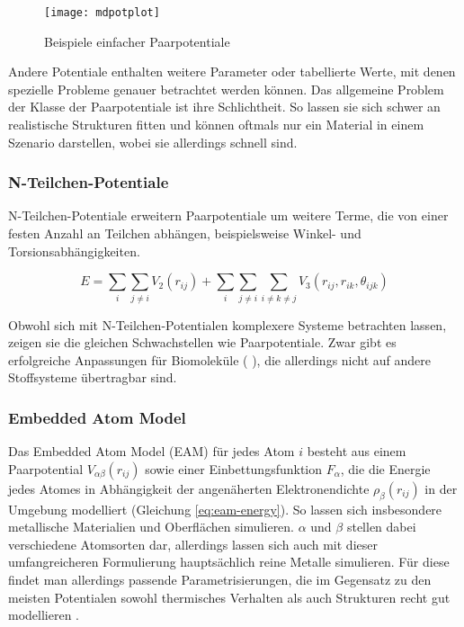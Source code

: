\begin{figure}
  \centering
  \texttt{[image: mdpotplot]}
  \caption{Beispiele einfacher Paarpotentiale}
  \label{fig:mdpairpotentials}
\end{figure}

Andere Potentiale enthalten weitere Parameter oder tabellierte Werte, mit denen spezielle Probleme genauer betrachtet werden können.
Das allgemeine Problem der Klasse der Paarpotentiale ist ihre Schlichtheit.
So lassen sie sich schwer an realistische Strukturen fitten und können oftmals nur ein Material in einem Szenario darstellen, wobei sie allerdings schnell sind.

\subsubsection{N-Teilchen-Potentiale}

N-Teilchen-Potentiale  erweitern Paarpotentiale um weitere Terme, die von einer festen Anzahl an Teilchen abhängen, beispielsweise Winkel- und Torsionsabhängigkeiten.

\begin{equation}
  \label{eq:nbody-energy}
  E = \sum_i\sum_{j \neq i}{V_2\left(r_{ij}\right)} + \sum_i\sum_{j \neq i}\sum_{i \neq k \neq j}{V_3\left(r_{ij}, r_{ik}, \theta_{ijk}\right)}
\end{equation}

Obwohl sich mit N-Teilchen-Potentialen komplexere Systeme betrachten lassen, zeigen sie die gleichen Schwachstellen wie Paarpotentiale.
Zwar gibt es erfolgreiche  Anpassungen für Biomoleküle (  ), die allerdings nicht auf andere Stoffsysteme übertragbar sind.

\subsubsection{Embedded Atom Model}

Das Embedded Atom Model (EAM) für jedes Atom $i$ besteht aus einem Paarpotential $V_{\alpha\beta}(r_{ij})$ sowie einer Einbettungsfunktion $F_\alpha$, die die Energie jedes Atomes in Abhängigkeit der angenäherten Elektronendichte $\rho_\beta(r_{ij})$ in der Umgebung modelliert (Gleichung \ref{eq:eam-energy}).
So lassen sich insbesondere metallische Materialien und Oberflächen simulieren.
$\alpha$ und $\beta$ stellen dabei verschiedene Atomsorten dar, allerdings lassen sich auch mit dieser umfangreicheren Formulierung hauptsächlich reine Metalle simulieren.
Für diese findet man allerdings passende Parametrisierungen, die im Gegensatz zu den meisten Potentialen sowohl thermisches Verhalten als auch Strukturen recht gut modellieren .

